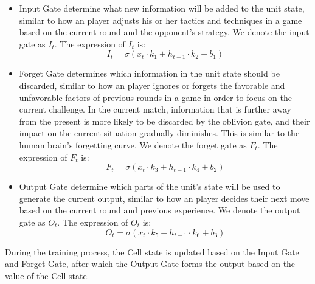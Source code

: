 \begin{itemize}[label=\textbf{\normalsize$\bullet$}]
    \item Input Gate determine what new information will be added to the unit state, similar to how an player adjusts his or her tactics and techniques in a game based on the current round and the opponent's strategy. We denote the input gate as $I_t$. The expression of $I_t$ is:
    \begin{equation}I_{t}=\sigma(x_{t}\cdot k_{1}+h_{t-1}\cdot k_{2}+b_{1})\end{equation}

    \item Forget Gate determines which information in the unit state should be discarded, similar to how an player ignores or forgets the favorable and unfavorable factors of previous rounds in a game in order to focus on the current challenge. In the current match, information that is further away from the present is more likely to be discarded by the oblivion gate, and their impact on the current situation gradually diminishes. This is similar to the human brain's forgetting curve. We denote the forget gate as $F_t$. The expression of $F_t$ is:
    \begin{equation}F_{t}=\sigma(x_{t}\cdot k_{3}+h_{t-1}\cdot k_{4}+b_{2})\end{equation}
    \item Output Gate determine which parts of the unit's state will be used to generate the current output, similar to how an player decides their next move based on the current round and previous experience. We denote the output gate as $O_t$. The expression of $O_t$ is:
    \begin{equation}O_{t}=\sigma(x_{t}\cdot k_{5}+h_{t-1}\cdot k_{6}+b_{3})\end{equation}
    \end{itemize}
    
During the training process, the Cell state is updated based on the Input Gate and Forget Gate, after which the Output Gate forms the output based on the value of the Cell state.


